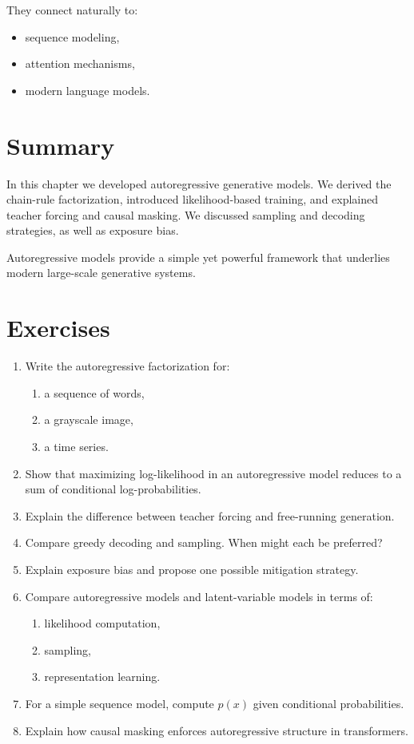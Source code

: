 They connect naturally to:
\begin{itemize}
    \item sequence modeling,
    \item attention mechanisms,
    \item modern language models.
\end{itemize}

\section{Summary}

In this chapter we developed autoregressive generative models. We derived the chain-rule factorization, introduced likelihood-based training, and explained teacher forcing and causal masking. We discussed sampling and decoding strategies, as well as exposure bias.

Autoregressive models provide a simple yet powerful framework that underlies modern large-scale generative systems.

\section*{Exercises}

\begin{enumerate}
    \item Write the autoregressive factorization for:
    \begin{enumerate}
        \item a sequence of words,
        \item a grayscale image,
        \item a time series.
    \end{enumerate}

    \item Show that maximizing log-likelihood in an autoregressive model reduces to a sum of conditional log-probabilities.

    \item Explain the difference between teacher forcing and free-running generation.

    \item Compare greedy decoding and sampling. When might each be preferred?

    \item Explain exposure bias and propose one possible mitigation strategy.

    \item Compare autoregressive models and latent-variable models in terms of:
    \begin{enumerate}
        \item likelihood computation,
        \item sampling,
        \item representation learning.
    \end{enumerate}

    \item For a simple sequence model, compute $p(x)$ given conditional probabilities.

    \item Explain how causal masking enforces autoregressive structure in transformers.
\end{enumerate}